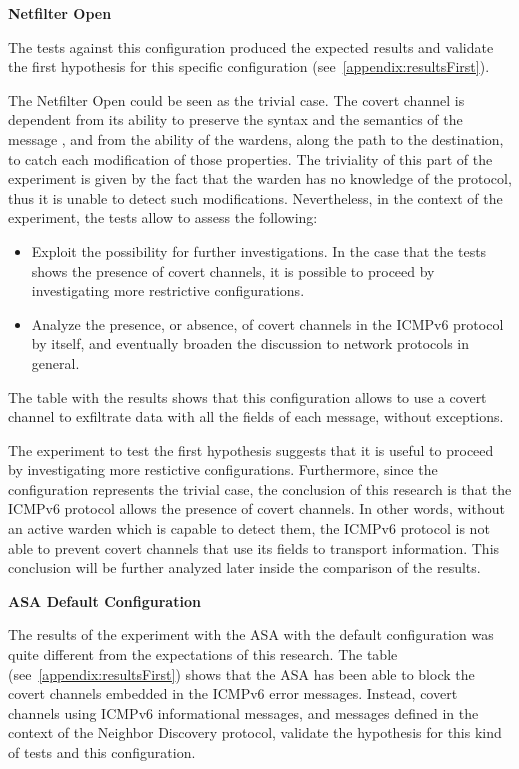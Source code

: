 \documentclass[12pt]{article}
\begin{document}
\textbf{Netfilter Open}
\label{resultsFirstNetfilterOpen}

The tests against this configuration produced the expected results and validate the first hypothesis for this specific configuration (see~\ref{appendix:resultsFirst}).

The Netfilter Open could be seen as the trivial case. The covert channel is dependent from its ability to preserve the syntax and the semantics of the message \cite{lewandowski}, and from the ability of the wardens, along the path to the destination, to catch each modification of those properties. The triviality of this part of the experiment is given by the fact that the warden has no knowledge of the protocol, thus it is unable to detect such modifications. Nevertheless, in the context of the experiment, the tests allow to assess the following:
\vspace{-15pt}
\begin{itemize}[noitemsep,topsep=0pt,partopsep=0pt]
 \item Exploit the possibility for further investigations. In the case that the tests shows the presence of covert channels, it is possible to proceed by investigating more restrictive configurations.
 \item Analyze the presence, or absence, of covert channels in the ICMPv6 protocol by itself, and eventually broaden the discussion to network protocols in general.
\end{itemize}

The table with the results shows that this configuration allows to use a covert channel to exfiltrate data with all the fields of each message, without exceptions.

The experiment to test the first hypothesis suggests that it is useful to proceed by investigating more restictive configurations. Furthermore, since the configuration represents the trivial case, the conclusion of this research is that the ICMPv6 protocol allows the presence of covert channels. In other words, without an active warden which is capable to detect them, the ICMPv6 protocol is not able to prevent covert channels that use its fields to transport information. This conclusion will be further analyzed later inside the comparison of the results.


\textbf{ASA Default Configuration}
\label{resultsFirstASADefault}

The results of the experiment with the ASA with the default configuration was quite different from the expectations of this research. The table (see~\ref{appendix:resultsFirst}) shows that the ASA has been able to block the covert channels embedded in the ICMPv6 error messages. Instead, covert channels using ICMPv6 informational messages, and messages defined in the context of the Neighbor Discovery protocol, validate the hypothesis for this kind of tests and this configuration.
\end{document}
